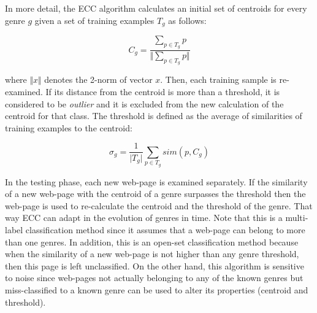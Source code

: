 In more detail, the ECC algorithm calculates an initial set of centroids for every genre $g$ given a set of training examples $T_g$ as follows:

\begin{equation}\label{eq:jebary_ecc_centroids}
	C_{g} = \frac{\sum_{p \in T_{g}} p}{\Vert \sum_{p \in T_{g}} p\Vert}
\end{equation}

\nointend where $\Vert x \Vert$ denotes the 2-norm of vector $x$. Then, each training sample is re-examined. If its distance from the centroid is more than a threshold, it is considered to be \textit{outlier} and it is excluded from the new calculation of the centroid for that class. The threshold is defined as the average of similarities of training examples to the centroid:

\begin{equation}\label{eq:jebary_ecc_theshold}
	\sigma_{g} = \frac{1}{\vert T_{g} \vert } \sum_{p \in T_{g}} sim(p, C_{g})
\end{equation}

In the testing phase, each new web-page is examined separately. If the similarity of a new web-page with the centroid of a genre surpasses the threshold then the web-page is used to re-calculate the centroid and the threshold of the genre. That way ECC can adapt in the evolution of genres in time. Note that this is a multi-label classification method since it assumes that a web-page can belong to more than one genres. In addition, this is an open-set classification method because when the similarity of a new web-page is not higher than any genre threshold, then this page is left unclassified. On the other hand, this algorithm is sensitive to noise since web-pages not actually belonging to any of the known genres but miss-classified to a known genre can be used to alter its properties (centroid and threshold). 



